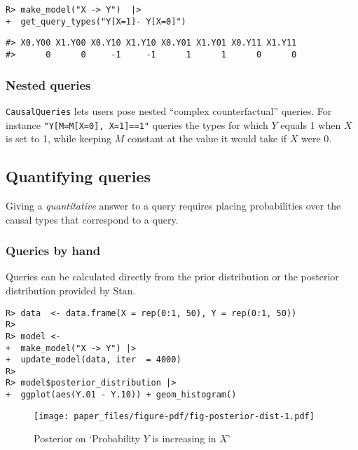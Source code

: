 \documentclass[
  11pt,
  article]{jss}
\begin{document}
\begin{verbatim}
R> make_model("X -> Y")  |>
+  get_query_types("Y[X=1]- Y[X=0]")
\end{verbatim}

\begin{verbatim}
#> X0.Y00 X1.Y00 X0.Y10 X1.Y10 X0.Y01 X1.Y01 X0.Y11 X1.Y11 
#>      0      0     -1     -1      1      1      0      0
\end{verbatim}

\hypertarget{nested-queries}{%
\subsubsection{Nested queries}\label{nested-queries}}

\texttt{CausalQueries} lets users pose nested ``complex counterfactual''
queries. For instance \texttt{"Y{[}M=M{[}X=0{]},\ X=1{]}==1"} queries
the types for which \(Y\) equals 1 when \(X\) is set to 1, while keeping
\(M\) constant at the value it would take if \(X\) were 0.

\hypertarget{quantifying-queries}{%
\subsection{Quantifying queries}\label{quantifying-queries}}

Giving a \emph{quantitative} answer to a query requires placing
probabilities over the causal types that correspond to a query.

\hypertarget{queries-by-hand}{%
\subsubsection{Queries by hand}\label{queries-by-hand}}

Queries can be calculated directly from the prior distribution or the
posterior distribution provided by Stan.

\begin{verbatim}
R> data  <- data.frame(X = rep(0:1, 50), Y = rep(0:1, 50))
R> 
R> model <- 
+  make_model("X -> Y") |>
+  update_model(data, iter  = 4000)
R> 
R> model$posterior_distribution |> 
+  ggplot(aes(Y.01 - Y.10)) + geom_histogram()
\end{verbatim}

\begin{figure}[t]

{\centering \texttt{[image: paper\_files/figure-pdf/fig-posterior-dist-1.pdf]}

}

\caption{\label{fig-posterior-dist}Posterior on `Probability \(Y\) is
increasing in \(X\)'}

\end{figure}
\end{document}

